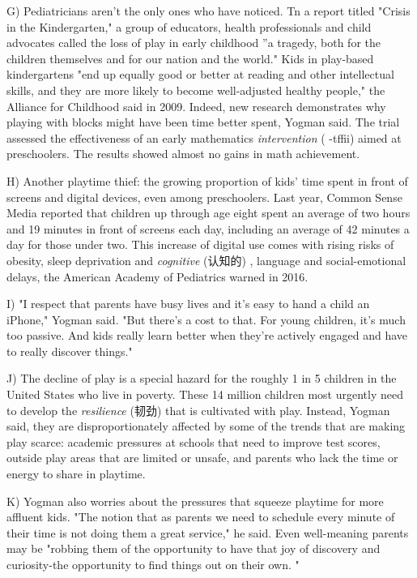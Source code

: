 \documentclass[UTF8,11pt]{ctexart}
\begin{document}
G) Pediatricians aren't the only ones who have noticed. Tn a report titled "Crisis in the Kindergarten," a group of educators, health professionals and child advocates called the loss of play in early childhood ''a tragedy, both for the children themselves and for our nation and the world." Kids in play-based kindergartens "end up equally good or better at reading and other intellectual skills, and they are more likely to become well-adjusted healthy people," the Alliance for Childhood said in 2009. Indeed, new research demonstrates why playing with blocks might have been time better spent, Yogman said. The trial assessed the effectiveness of an early mathematics \textit{intervention }( -tffii) aimed at preschoolers. The results showed almost no gains in math achievement.


H) Another playtime thief: the growing proportion of kids' time spent in front of screens and digital devices, even among preschoolers. Last year, Common Sense Media reported that children up through age eight spent an average of two hours and 19 minutes in front of screens each day, including an average of 42 minutes a day for those under two. This increase of digital use comes with rising risks of obesity, sleep deprivation and \textit{cognitive }(认知的) , language and social-emotional delays, the American Academy of Pediatrics warned in 2016.


I) "I respect that parents have busy lives and it's easy to hand a child an iPhone," Yogman said. "But there's a cost to that. For young children, it's much too passive. And kids really learn better when they're actively engaged and have to really discover things."


J) The decline of play is a special hazard for the roughly 1 in 5 children in the United States who live in poverty. These 14 million children most urgently need to develop the \textit{resilience }(韧劲) that is cultivated with play. Instead, Yogman said, they are disproportionately affected by some of the trends that are making play scarce: academic pressures at schools that need to improve test scores, outside play areas that are limited or unsafe, and parents who lack the time or energy to share in playtime.


K) Yogman also worries about the pressures that squeeze playtime for more affluent kids. "The notion that as parents we need to schedule every minute of their time is not doing them a great service," he said. Even well-meaning parents may be "robbing them of the opportunity to have that joy of discovery and curiosity-the opportunity to find things out on their own. "
\end{document}
